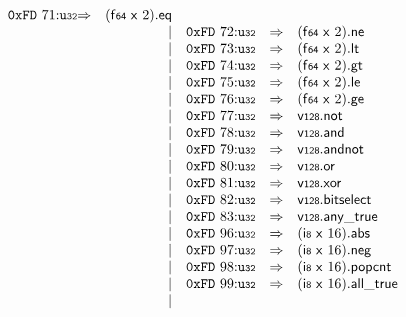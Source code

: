 $$\begin{array}{@{}l@{}rrlll@{}l@{}}
\mathtt{0xFD}~71{:}{\mathtt{u{\scriptstyle32}}} &\Rightarrow& (\mathsf{f{\scriptstyle64}}~\mathsf{x}~2) . \mathsf{eq} \\ &&|&
\mathtt{0xFD}~72{:}{\mathtt{u{\scriptstyle32}}} &\Rightarrow& (\mathsf{f{\scriptstyle64}}~\mathsf{x}~2) . \mathsf{ne} \\ &&|&
\mathtt{0xFD}~73{:}{\mathtt{u{\scriptstyle32}}} &\Rightarrow& (\mathsf{f{\scriptstyle64}}~\mathsf{x}~2) . \mathsf{lt} \\ &&|&
\mathtt{0xFD}~74{:}{\mathtt{u{\scriptstyle32}}} &\Rightarrow& (\mathsf{f{\scriptstyle64}}~\mathsf{x}~2) . \mathsf{gt} \\ &&|&
\mathtt{0xFD}~75{:}{\mathtt{u{\scriptstyle32}}} &\Rightarrow& (\mathsf{f{\scriptstyle64}}~\mathsf{x}~2) . \mathsf{le} \\ &&|&
\mathtt{0xFD}~76{:}{\mathtt{u{\scriptstyle32}}} &\Rightarrow& (\mathsf{f{\scriptstyle64}}~\mathsf{x}~2) . \mathsf{ge} \\ &&|&
\mathtt{0xFD}~77{:}{\mathtt{u{\scriptstyle32}}} &\Rightarrow& \mathsf{v{\scriptstyle128}} . \mathsf{not} \\ &&|&
\mathtt{0xFD}~78{:}{\mathtt{u{\scriptstyle32}}} &\Rightarrow& \mathsf{v{\scriptstyle128}} . \mathsf{and} \\ &&|&
\mathtt{0xFD}~79{:}{\mathtt{u{\scriptstyle32}}} &\Rightarrow& \mathsf{v{\scriptstyle128}} . \mathsf{andnot} \\ &&|&
\mathtt{0xFD}~80{:}{\mathtt{u{\scriptstyle32}}} &\Rightarrow& \mathsf{v{\scriptstyle128}} . \mathsf{or} \\ &&|&
\mathtt{0xFD}~81{:}{\mathtt{u{\scriptstyle32}}} &\Rightarrow& \mathsf{v{\scriptstyle128}} . \mathsf{xor} \\ &&|&
\mathtt{0xFD}~82{:}{\mathtt{u{\scriptstyle32}}} &\Rightarrow& \mathsf{v{\scriptstyle128}} . \mathsf{bitselect} \\ &&|&
\mathtt{0xFD}~83{:}{\mathtt{u{\scriptstyle32}}} &\Rightarrow& \mathsf{v{\scriptstyle128}} . \mathsf{any\_true} \\ &&|&
\mathtt{0xFD}~96{:}{\mathtt{u{\scriptstyle32}}} &\Rightarrow& (\mathsf{i{\scriptstyle8}}~\mathsf{x}~16) . \mathsf{abs} \\ &&|&
\mathtt{0xFD}~97{:}{\mathtt{u{\scriptstyle32}}} &\Rightarrow& (\mathsf{i{\scriptstyle8}}~\mathsf{x}~16) . \mathsf{neg} \\ &&|&
\mathtt{0xFD}~98{:}{\mathtt{u{\scriptstyle32}}} &\Rightarrow& (\mathsf{i{\scriptstyle8}}~\mathsf{x}~16) . \mathsf{popcnt} \\ &&|&
\mathtt{0xFD}~99{:}{\mathtt{u{\scriptstyle32}}} &\Rightarrow& (\mathsf{i{\scriptstyle8}}~\mathsf{x}~16) . \mathsf{all\_true} \\ &&|&

\end{array}$$
